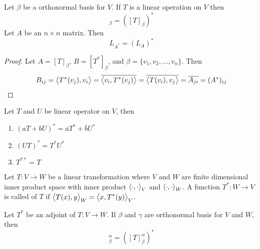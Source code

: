 \begin{theorem}
    Let $\beta$ be a orthonormal basis for $V$. If $T$ is a linear operation on $V$ then
    \begin{equation}
        [T^*]_\beta = \left([T]_\beta \right)^*
    \end{equation}
    Let $A$ be an $n \times n$ matrix. Then
    \begin{equation}
        L_{A^*} = \left(L_A \right)^*
    \end{equation}
\end{theorem}
\begin{proof}
    Let $A=[T]_\beta$, $B=[T^*]_\beta$, and $\beta=\{v_1, v_2, \dots, v_n \}$. Then
    \begin{equation*}
        B_{ij} = \left\langle \displaystyle T^*(v_j), v_i \right\rangle = \overline{\left\langle \displaystyle v_i, T^*(v_j) \right\rangle} = \overline{\left\langle \displaystyle T(v_i), v_j \right\rangle} = \overline{A_{ji}} = (A^*)_{ij}
    \end{equation*}
\end{proof}

\begin{theorem}
    Let $T$ and $U$ be linear operator on $V$, then
    \begin{enumerate}
        \item $(aT+bU)^* = \overline{a}T^* + \overline{b}U^*$
        \item $(UT)^* = T^* U^*$
        \item $T^{**} = T$
    \end{enumerate}    
\end{theorem}


\begin{definition}
    Let $T : V \rightarrow W$ be a linear transformation where $V$ and $W$ are finite dimensional inner product space with inner product $\left\langle \displaystyle \cdot{}, \cdot{} \right\rangle_V$ and $\left\langle \displaystyle \cdot{}, \cdot{} \right\rangle_W$. A function $T^* : W \rightarrow V$ is called  of $T$ if $\left\langle \displaystyle T(x), y \right\rangle_W = \left\langle \displaystyle x, T^*(y) \right\rangle_V$.
\end{definition}

\begin{theorem}
    Let $T^*$ be an adjoint of $T: V \rightarrow W$. If $\beta$ and $\gamma$ are orthonormal basis for $V$ and $W$, then
    \begin{equation}
        [T^*]_\beta^\alpha = \left([T]_\beta^\alpha\right)^*
    \end{equation}
\end{theorem}

